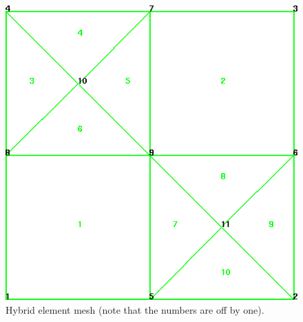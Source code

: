 \documentclass[12pt]{article}
\begin{document}
\clearpage
\begin{figure}
  \centerline{\includegraphics[width=.9\textwidth]{hybrid_mesh}}
  \caption{Hybrid element mesh (note that the numbers are off by one).}
\end{figure}

\clearpage
\end{document}

